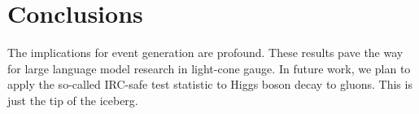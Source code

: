 \section{Conclusions}\label{sec:conclusions}

The implications for event generation are profound. These results pave
the way for large language model research in light-cone gauge. In future
work, we plan to apply the so-called IRC-safe test statistic to Higgs
boson decay to gluons. This is just the tip of the iceberg.


